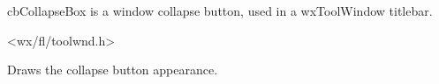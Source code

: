 %
%


\section{}\label{cbcollapsebox}


cbCollapseBox is a window collapse button, used in a wxToolWindow titlebar.




<wx/fl/toolwnd.h>




\label{cbcollapseboxdraw}


Draws the collapse button appearance.

